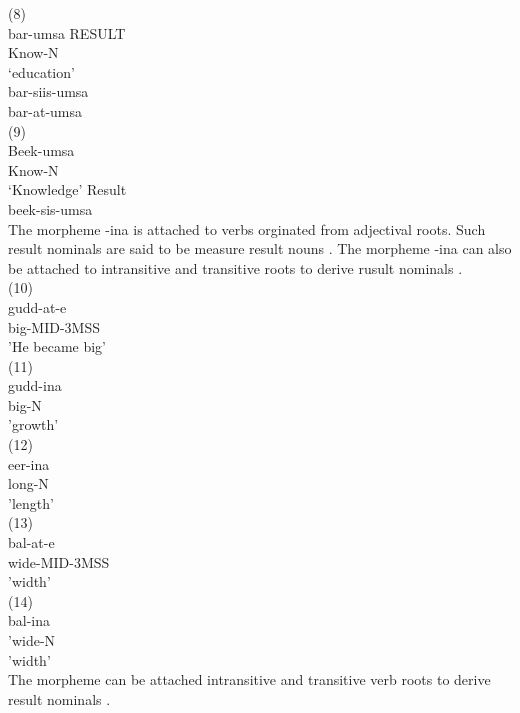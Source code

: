 \documentclass[11pt,a4paper]{article}
\begin{document}
(8)\\
\indent bar-umsa RESULT\\
\indent Know-N\\
\indent ‘education’\\
\indent *bar-siis-umsa\\
\indent *bar-at-umsa\\

(9)\\
\indent Beek-umsa\\
\indent Know-N\\
\indent ‘Knowledge’ Result\\
\indent *beek-sis-umsa\\ 


The morpheme -ina is attached to verbs orginated from adjectival roots. Such result nominals are said to be measure result nouns \cite{uth2015event}. The morpheme -ina can also be attached to intransitive and transitive roots to derive rusult nominals \cite{gaddisa2001,temesgen1985,tolemariam2011}. \\

(10)\\
\indent gudd-at-e\\
\indent big-MID-3MSS\\
\indent 'He became big'\\

(11)\\
\indent gudd-ina\\
\indent big-N\\
\indent 'growth'\\

(12)\\
\indent {}eer-ina\\
\indent long-N\\
\indent 'length'\\

(13)\\
\indent bal\textipa\textbarglotstop-at-e\\
\indent wide-MID-3MSS\\
\indent 'width'\\

(14)\\
\indent bal\textipa\textbarglotstop-ina\\
\indent 'wide-N\\
\indent 'width'\\

The morpheme can be attached intransitive and transitive verb roots to derive result nominals \cite{gaddisa2001,temesgen1985,tolemariam2011}.\\
\end{document}
